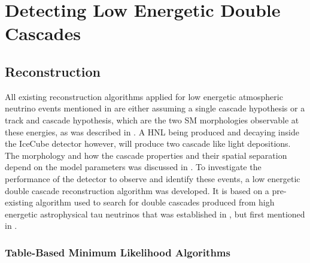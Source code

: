 \setchapterpreamble[u]{\margintoc}

\chapter{Detecting Low Energetic Double Cascades}


\section{Reconstruction} 

All existing reconstruction algorithms applied for low energetic atmospheric neutrino events mentioned in  are either assuming a single cascade hypothesis or a track and cascade hypothesis, which are the two SM morphologies observable at these energies, as was described in . A HNL being produced and decaying inside the IceCube detector however, will produce two cascade like light depositions. The morphology and how the cascade properties and their spatial separation depend on the model parameters was discussed in . To investigate the performance of the detector to observe and identify these events, a low energetic double cascade reconstruction algorithm was developed. It is based on a pre-existing algorithm used to search for double cascades produced from high energetic astrophysical tau neutrinos  that was established in , but first mentioned in .


\subsection{Table-Based Minimum Likelihood Algorithms}

